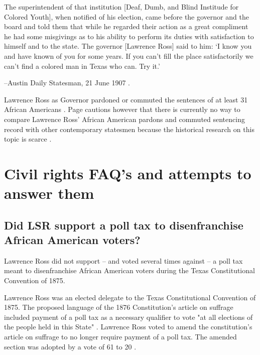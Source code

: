 \documentclass[12pt]{article}
\begin{document}
\begin{displayquote}
The superintendent of that institution [Deaf, Dumb, and Blind Institude for Colored Youth], when notified of his election, came before the governor and the board and told them that while he regarded their action as a great compliment he had some misgivings as to his ability to perform its duties with satisfaction to himself and to the state. The governor [Lawrence Ross] said to him: ‘I know you and have known of you for some years. If you can’t fill the place satisfactorily we can’t find a colored man in Texas who can. Try it.’

--Austin Daily Statesman, 21 June 1907 \cite{astatesman:1907-06-21}.
\end{displayquote}

Lawrence Ross as Governor pardoned or commuted the sentences of at least 31 African Americans \cite[pg. 146]{page}. Page cautions however that there is currently no way to compare Lawrence Ross' African American pardons and commuted sentencing record with other contemporary statesmen because the historical research on this topic is scarce \cite{page:email}.  

\newpage
\section{Civil rights FAQ's and attempts to answer them}

\subsection{Did LSR support a poll tax to disenfranchise African American voters?}
Lawrence Ross did not support -- and voted several times against -- a poll tax meant to disenfranchise African American voters during the Texas Constitutional Convention of 1875. 

Lawrence Ross was an elected delegate to the Texas Constitutional Convention of 1875. The proposed language of the 1876 Constitution's article on suffrage included payment of a poll tax as a necessary qualifier to vote "at all elections of the people held in this State" \cite[pg. 238]{tx:1876constitution:journ}. Lawrence Ross voted to amend the constitution's article on suffrage to no longer require payment of a poll tax. The amended section was adopted by a vote of 61 to 20 \cite[pg. 307-308]{tx:1876constitution:journ}. 
\end{document}
